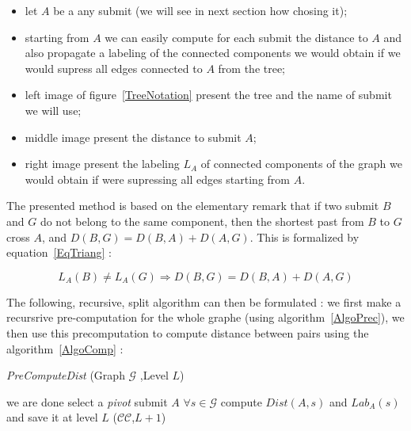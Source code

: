 \documentclass[a4paper]{article}
\begin{document}
\begin{itemize}
   \item  let $A$ be a any submit (we will see in next section how chosing it);

   \item  starting from $A$ we can easily compute for each submit the distance 
          to $A$ and also propagate a labeling of the connected components 
          we would obtain if we would supress all edges connected to $A$ from the tree;

   \item  left image of figure~\ref{TreeNotation} present the tree and the name of submit we will use;

   \item  middle image present the distance  to submit $A$;

   \item  right image present the labeling $L_A$  of connected components of the graph we would obtain
          if were supressing all edges starting from $A$.
 
\end{itemize}

The presented  method is based on the elementary remark that if two submit $B$ and $G$ do not belong
to the same component, then the shortest past from $B$ to $G$ cross $A$, and $D(B,G) = D(B,A) + D(A,G)$.
This is formalized by equation~\ref{EqTriang} :

\begin{equation}
   L_A(B) \neq L_A(G) \Rightarrow  D(B,G) = D(B,A) + D(A,G) \label{EqTriang}
\end{equation}


The following, recursive, split algorithm can then be formulated : we first
make a recursrive pre-computation for the whole graphe (using algorithm~\ref{AlgoPrec}),
we then use this precomputation  to compute distance between pairs using the 
algorithm~\ref{AlgoComp} :

\begin{algorithm}
\caption{{\it PreComputeDist} (Graph $\mathcal{G}$ ,Level  $L$)} 
\begin{algorithmic}
       \STATE we are done
    \ELSE
        \STATE select a \emph{pivot} submit $A$ 
        \STATE $\forall s\in \mathcal{G}$ compute $Dist(A,s)$ and $Lab_A(s) $ and save it at level $L$
               ($\mathcal{CC}$,$L+1$)
        \ENDFOR
    \ENDIF
\end{algorithmic}
\label{AlgoPrec}
\end{algorithm}
\end{document}
